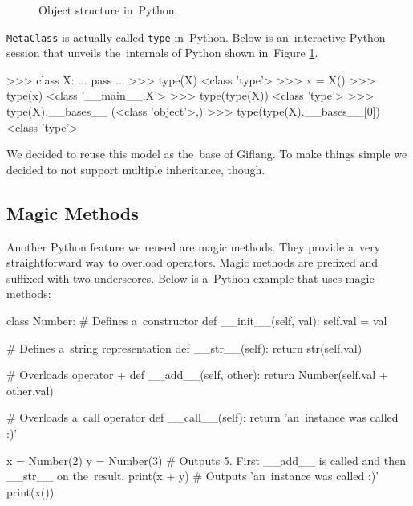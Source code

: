 \begin{figure}[!hbt]
{
    }
    \caption{Object structure in~Python.}
	\label{fig:chap3:python_structure}
\end{figure}

\texttt{MetaClass} is actually called \texttt{type} in~Python. Below is an~interactive Python session that unveils the~internals of Python shown
in~Figure \ref{fig:chap3:python_structure}.
\begin{code}
>>> class X:
...     pass
... 
>>> type(X)
<class 'type'>
>>> x = X()
>>> type(x)
<class '__main__.X'>
>>> type(type(X))
<class 'type'>
>>> type(X).__bases__
(<class 'object'>,)
>>> type(type(X).__bases__[0])
<class 'type'>
\end{code}

We decided to reuse this model as the~base of Giflang. To make things simple we decided to not support multiple inheritance, though.

\subsection{Magic Methods}
Another Python feature we reused are magic methods. They provide a~very straightforward way
to overload operators. Magic methods are prefixed and suffixed with two underscores. Below is a~Python example that uses magic methods:
\begin{code}
class Number:
    # Defines a~constructor
    def __init__(self, val):
        self.val = val
    
    # Defines a~string representation
    def __str__(self):
        return str(self.val)

    # Overloads operator +
    def __add__(self, other):
        return Number(self.val + other.val)

    # Overloads a~call operator
    def __call__(self):
        return 'an~instance was called :)'

x = Number(2)
y = Number(3)
# Outputs 5. First __add__ is called and then __str__ on the~result.
print(x + y)
# Outputs 'an~instance was called :)'
print(x())
\end{code}

